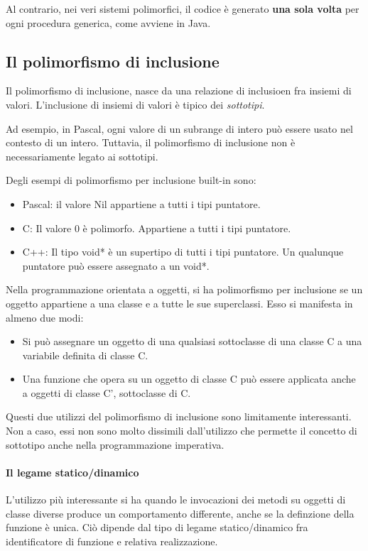 \documentclass[12pt]{report}
\begin{document}
Al contrario, nei veri sistemi polimorfici, il codice è generato \textbf{una sola volta} per ogni procedura generica, come avviene in Java.
\subsection{Il polimorfismo di inclusione}
Il polimorfismo di inclusione, nasce da una relazione di inclusioen fra insiemi di valori. L'inclusione di insiemi di valori è tipico dei \textit{sottotipi}.

Ad esempio, in Pascal, ogni valore di un subrange di intero può essere usato nel contesto di un intero. Tuttavia, il polimorfismo di inclusione non è necessariamente legato ai sottotipi.

Degli esempi di polimorfismo per inclusione built-in sono:
\begin{itemize}
	\item Pascal: il valore Nil appartiene a tutti i tipi puntatore.
	\item C: Il valore 0 è polimorfo. Appartiene a tutti i tipi puntatore.
	\item C++: Il tipo void* è un supertipo di tutti i tipi puntatore. Un qualunque puntatore può essere assegnato a un void*.
\end{itemize}
Nella programmazione orientata a oggetti, si ha polimorfismo per inclusione se un oggetto appartiene a una classe e a tutte le sue superclassi. Esso si manifesta in almeno due modi:
\begin{itemize}
	\item Si può assegnare un oggetto di una qualsiasi sottoclasse di una classe C a una variabile definita di classe C.
	\item Una funzione che opera su un oggetto di classe C può essere applicata anche a oggetti di classe C', sottoclasse di C.
\end{itemize}
Questi due utilizzi del polimorfismo di inclusione sono limitamente interessanti. Non a caso, essi non sono molto dissimili dall'utilizzo che permette il concetto di sottotipo anche nella programmazione imperativa.
\paragraph{Il legame statico/dinamico}
L'utilizzo più interessante si ha quando le invocazioni dei metodi su oggetti di classe diverse produce un comportamento differente, anche se la definzione della funzione è unica. Ciò dipende dal tipo di legame statico/dinamico fra identificatore di funzione e relativa realizzazione.
\end{document}
